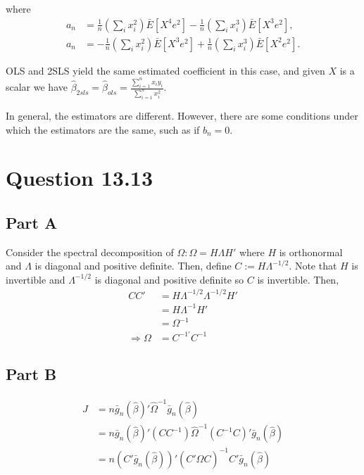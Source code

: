 \documentclass[11pt]{article} %
\begin{document}
where
\begin{align*}
a_n &= \frac{1}{n}\left( \sum_i x_i^2 \right) \bar{E}[X^4e^2] - \frac{1}{n}\left( \sum_i x_i^3 \right) \bar{E}[X^3e^2], \\
a_n &= -\frac{1}{n}\left( \sum_i x_i^2 \right) \bar{E}[X^3e^2] + \frac{1}{n}\left( \sum_i x_i^3 \right) \bar{E}[X^2e^2].
\end{align*}

OLS and 2SLS yield the same estimated coefficient in this case, and given $X$ is a scalar we have $\hat{\beta}_{2sls} =\hat{\beta}_{ols} = \frac{\sum_{i=1}^n x_iy_i}{\sum_{i=1}^n x_i^2}.$

In general, the estimators are different. However, there are some conditions under which the estimators are the same, such as if $b_n = 0.$

\section{Question 13.13}
\subsection{Part A}
Consider the spectral decomposition of $\Omega: \Omega = H\Lambda H'$ where $H$ is orthonormal and $\Lambda$ is diagonal and positive definite. Then, define $C:= H \Lambda^{-1/2}$. Note that $H$ is invertible and $\Lambda^{-1/2}$ is diagonal and positive definite so $C$ is invertible. Then,
\begin{align*}
CC' &= H \Lambda^{-1/2} \Lambda^{-1/2}H'\\
&= H \Lambda^{-1}H'\\
&= \Omega^{-1}\\
\Rightarrow \Omega &= C^{-1'}C^{-1}
\end{align*}
\subsection{Part B}
\begin{align*}
J &= n\bar{g}_n(\hat{\beta})'\hat{\Omega}^{-1}\bar{g}_n(\hat{\beta}) \\
&= n\bar{g}_n(\hat{\beta})'(CC^{-1})\hat{\Omega}^{-1}(C^{-1}C)'\bar{g}_n(\hat{\beta}) \\
&= n(C'\bar{g}_n(\hat{\beta}))'(C'\hat{\Omega}C)^{-1}C'\bar{g}_n(\hat{\beta}) \\
\end{align*}
\end{document}
